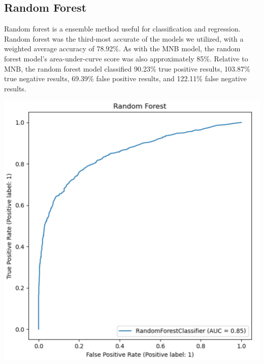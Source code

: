 \documentclass[11pt]{article}
\begin{document}
\subsection{Random Forest}

Random forest is a ensemble method useful for classification and regression. Random forest was the third-most accurate of the models we utilized, with a weighted average accuracy of 78.92\%. As with the MNB model, the random forest model's area-under-curve score was also approximately 85\%. Relative to MNB, the random forest model classified 90.23\% true positive results, 103.87\% true negative results, 69.39\% false positive results, and 122.11\% false negative results.

\begin{minipage}[t]{.45\linewidth}
\includegraphics[width=\linewidth]{images/rf_plot.png}
\end{minipage}\hfill
\end{document}
